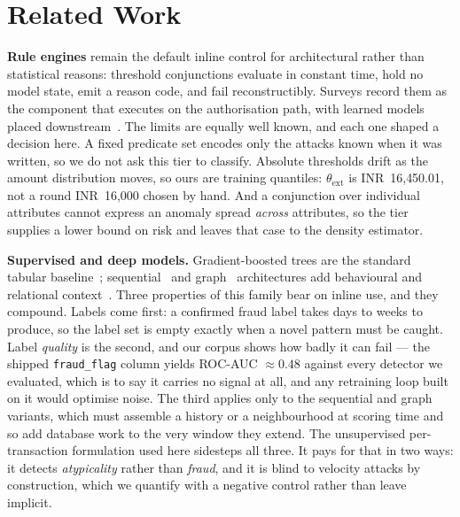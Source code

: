 \documentclass[conference]{IEEEtran}
\newcommand{\INR}[1]{\mbox{INR~#1}}
\begin{document}
\section{Related Work}
\label{sec:relatedwork}

\textbf{Rule engines} remain the default inline control for
architectural rather than statistical reasons: threshold conjunctions
evaluate in constant time, hold no model state, emit a reason code, and
fail reconstructibly. Surveys record them as the component that
executes on the authorisation path, with learned models placed
downstream~\cite{abdallah2016}. The limits are equally well known, and
each one shaped a decision here. A fixed predicate set encodes only the
attacks known when it was written, so we do not ask this tier to
classify. Absolute thresholds drift as the amount distribution moves,
so ours are training quantiles: $\theta_{\mathrm{ext}}$ is
\INR{16{,}450.01}, not a round \INR{16{,}000} chosen by hand. And a
conjunction over individual attributes cannot express an anomaly spread
\emph{across} attributes, so the tier supplies a lower bound on risk
and leaves that case to the density estimator.

\textbf{Supervised and deep models.} Gradient-boosted trees are the
standard tabular baseline~\cite{chen2016}; sequential~\cite{jurgovsky2018}
and graph~\cite{dou2020} architectures add behavioural and relational
context~\cite{adewumi2017}. Three properties of this family bear on
inline use, and they compound. Labels come first: a confirmed fraud
label takes days to weeks to produce, so the label set is empty exactly
when a novel pattern must be caught. Label \emph{quality} is the
second, and our corpus shows how badly it can fail --- the shipped
\texttt{fraud\_flag} column yields ROC-AUC $\approx 0.48$ against every
detector we evaluated, which is to say it carries no signal at all, and
any retraining loop built on it would optimise noise. The third applies
only to the sequential and graph variants, which must assemble a
history or a neighbourhood at scoring time and so add database work to
the very window they extend. The unsupervised per-transaction
formulation used here sidesteps all three. It pays for that in two
ways: it detects \emph{atypicality} rather than \emph{fraud}, and it is
blind to velocity attacks by construction, which we quantify with a
negative control rather than leave implicit.
\end{document}
